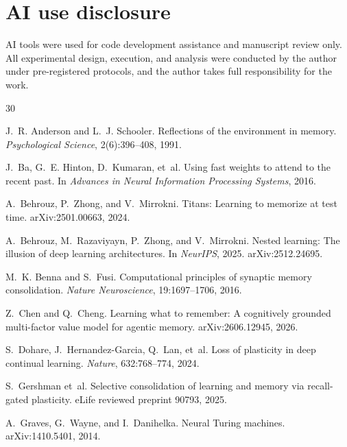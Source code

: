 \documentclass[10pt,twocolumn]{article}
\theoremstyle{definition}
\begin{document}
\section*{AI use disclosure}
AI tools were used for code development assistance and manuscript review only. All experimental design,
execution, and analysis were conducted by the author under pre-registered protocols, and the author takes
full responsibility for the work.


\begin{thebibliography}{30}

J.~R. Anderson and L.~J. Schooler.
\newblock Reflections of the environment in memory.
\newblock \emph{Psychological Science}, 2(6):396--408, 1991.

J.~Ba, G.~E. Hinton, D.~Kumaran, et~al.
\newblock Using fast weights to attend to the recent past.
\newblock In \emph{Advances in Neural Information Processing Systems}, 2016.

A.~Behrouz, P.~Zhong, and V.~Mirrokni.
\newblock Titans: Learning to memorize at test time.
\newblock arXiv:2501.00663, 2024.

A.~Behrouz, M.~Razaviyayn, P.~Zhong, and V.~Mirrokni.
\newblock Nested learning: The illusion of deep learning architectures.
\newblock In \emph{NeurIPS}, 2025. arXiv:2512.24695.

M.~K. Benna and S.~Fusi.
\newblock Computational principles of synaptic memory consolidation.
\newblock \emph{Nature Neuroscience}, 19:1697--1706, 2016.

Z.~Chen and Q.~Cheng.
\newblock Learning what to remember: A cognitively grounded multi-factor value model for agentic memory.
\newblock arXiv:2606.12945, 2026.

S.~Dohare, J.~Hernandez-Garcia, Q.~Lan, et~al.
\newblock Loss of plasticity in deep continual learning.
\newblock \emph{Nature}, 632:768--774, 2024.

S.~Gershman et~al.
\newblock Selective consolidation of learning and memory via recall-gated plasticity.
\newblock eLife reviewed preprint 90793, 2025.

A.~Graves, G.~Wayne, and I.~Danihelka.
\newblock Neural Turing machines.
\newblock arXiv:1410.5401, 2014.


\end{thebibliography}
\end{document}
